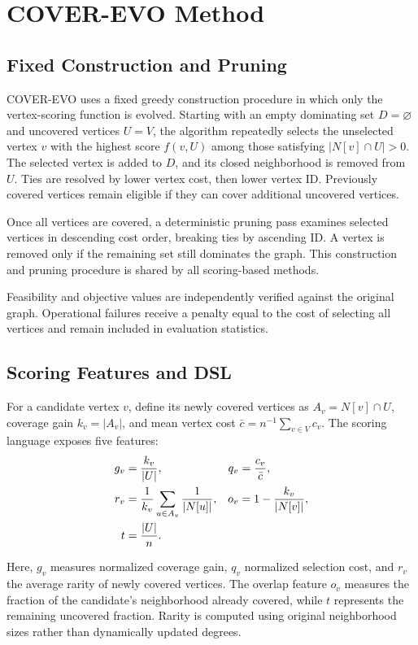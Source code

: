 \section{COVER-EVO Method}

\subsection{Fixed Construction and Pruning}

COVER-EVO uses a fixed greedy construction procedure in
which only the vertex-scoring function is evolved. Starting
with an empty dominating set $D=\varnothing$ and uncovered
vertices $U=V$, the algorithm repeatedly selects the
unselected vertex $v$ with the highest score $f(v,U)$
among those satisfying $|N[v]\cap U|>0$. The selected
vertex is added to $D$, and its closed neighborhood is
removed from $U$. Ties are resolved by lower vertex cost,
then lower vertex ID. Previously covered vertices remain
eligible if they can cover additional uncovered vertices.

Once all vertices are covered, a deterministic pruning
pass examines selected vertices in descending cost order,
breaking ties by ascending ID. A vertex is removed only
if the remaining set still dominates the graph. This
construction and pruning procedure is shared by all
scoring-based methods.

Feasibility and objective values are independently
verified against the original graph. Operational failures
receive a penalty equal to the cost of selecting all
vertices and remain included in evaluation statistics.

\subsection{Scoring Features and DSL}

For a candidate vertex $v$, define its newly covered
vertices as $A_v=N[v]\cap U$, coverage gain
$k_v=|A_v|$, and mean vertex cost
$\bar c=n^{-1}\sum_{v\in V}c_v$.
The scoring language exposes five features:
\begin{align}
g_v &= \frac{k_v}{|U|},
&q_v &= \frac{c_v}{\bar c}, \notag\\
r_v &= \frac{1}{k_v}\sum_{u\in A_v}
       \frac{1}{|N[u]|},
&o_v &= 1-\frac{k_v}{|N[v]|},
\label{eq:features}\\
t &= \frac{|U|}{n}. &&
\notag
\end{align}

Here, $g_v$ measures normalized coverage gain, $q_v$
normalized selection cost, and $r_v$ the average rarity
of newly covered vertices. The overlap feature $o_v$
measures the fraction of the candidate's neighborhood
already covered, while $t$ represents the remaining
uncovered fraction. Rarity is computed using original
neighborhood sizes rather than dynamically updated
degrees.

